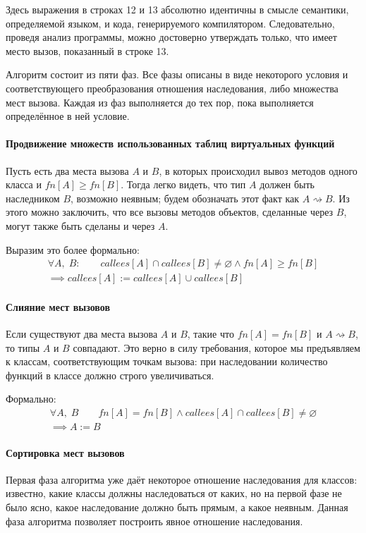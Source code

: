 \documentclass[a4paper,12pt,russian]{article}
\newcommand{\code}[1]{\textsf{#1}}
\begin{document}
Здесь выражения в строках \code{12} и \code{13} абсолютно идентичны в смысле семантики, определяемой языком, и кода, генерируемого компилятором.
Следовательно, проведя анализ программы, можно достоверно утверждать только, что имеет место вызов, показанный в строке \code{13}.

Алгоритм состоит из пяти фаз.
Все фазы описаны в виде некоторого условия и соответствующего преобразования отношения наследования, либо множества мест вызова.
Каждая из фаз выполняется до тех пор, пока выполняется определённое в ней условие.

\paragraph{Продвижение множеств использованных таблиц виртуальных функций}
Пусть есть два места вызова $A$ и $B$, в которых происходил вывоз методов одного класса и $fn[A] \geq fn[B]$.
Тогда легко видеть, что тип $A$ должен быть наследником $B$, возможно неявным; будем обозначать этот факт как $A \rightsquigarrow B$.
Из этого можно заключить, что все вызовы методов объектов, сделанные через $B$, могут также быть сделаны и через $A$.

Выразим это более формально:
\begin{eqnarray*}
\forall A,\;B:\qquad callees[A] \cap callees[B] \neq \varnothing \wedge fn[A] \geq fn[B]\\
\implies callees[A] := callees[A] \cup callees[B]
\end{eqnarray*}

\paragraph{Слияние мест вызовов}
Если существуют два места вызова $A$ и $B$, такие что $fn[A] = fn[B]$ и $A \rightsquigarrow B$, то типы $A$ и $B$ совпадают.
Это верно в силу требования, которое мы предъявляем к классам, соответствующим точкам вызова: при наследовании количество функций в классе должно строго увеличиваться.

Формально:
\begin{eqnarray*}
\forall A,\;B\qquad fn[A] = fn[B] \wedge callees[A] \cap callees[B] \neq \varnothing\\
\implies A := B
\end{eqnarray*}

\paragraph{Сортировка мест вызовов}
Первая фаза алгоритма уже даёт некоторое отношение наследования для классов: известно, какие классы должны наследоваться от каких, но на первой фазе не было ясно, какое наследование должно быть прямым, а какое неявным. Данная фаза алгоритма позволяет построить явное отношение наследования.
\end{document}
